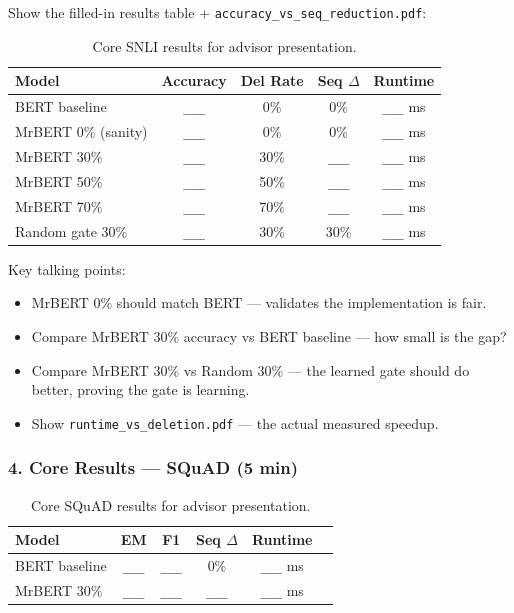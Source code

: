 \documentclass[11pt,a4paper]{article}
\newcommand{\tbd}{\textcolor{placeholder}{\texttt{\_\_\_}}}
\begin{document}
Show the filled-in results table + \texttt{accuracy\_vs\_seq\_reduction.pdf}:

\begin{table}[h]
\centering
\begin{tabular}{@{}lcccc@{}}
\toprule
\textbf{Model} & \textbf{Accuracy} & \textbf{Del Rate} & \textbf{Seq $\Delta$} & \textbf{Runtime} \\
\midrule
BERT baseline       & \tbd & 0\%  & 0\%  & \tbd{} ms \\
MrBERT 0\% (sanity) & \tbd & 0\%  & 0\%  & \tbd{} ms \\
MrBERT 30\%         & \tbd & 30\% & \tbd & \tbd{} ms \\
MrBERT 50\%         & \tbd & 50\% & \tbd & \tbd{} ms \\
MrBERT 70\%         & \tbd & 70\% & \tbd & \tbd{} ms \\
Random gate 30\%    & \tbd & 30\% & 30\% & \tbd{} ms \\
\bottomrule
\end{tabular}
\caption{Core SNLI results for advisor presentation.}
\label{tab:advisor-snli}
\end{table}

Key talking points:
\begin{itemize}[nosep]
    \item MrBERT 0\% should match BERT --- validates the implementation is fair.
    \item Compare MrBERT 30\% accuracy vs BERT baseline --- how small is the gap?
    \item Compare MrBERT 30\% vs Random 30\% --- the learned gate should do better, proving the gate is learning.
    \item Show \texttt{runtime\_vs\_deletion.pdf} --- the actual measured speedup.
\end{itemize}

\subsubsection*{4. Core Results --- SQuAD (5 min)}

\begin{table}[h]
\centering
\begin{tabular}{@{}lccccc@{}}
\toprule
\textbf{Model} & \textbf{EM} & \textbf{F1} & \textbf{Seq $\Delta$} & \textbf{Runtime} \\
\midrule
BERT baseline & \tbd & \tbd & 0\%  & \tbd{} ms \\
MrBERT 30\%   & \tbd & \tbd & \tbd & \tbd{} ms \\
\bottomrule
\end{tabular}
\caption{Core SQuAD results for advisor presentation.}
\label{tab:advisor-squad}
\end{table}
\end{document}
